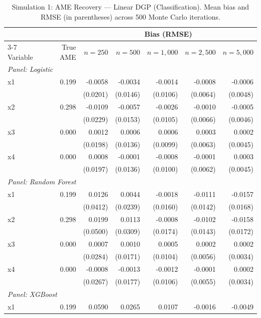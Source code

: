 \begin{table}[htbp]
\centering
\small
\begin{threeparttable}
\caption{Simulation 1: AME Recovery --- Linear DGP (Classification). Mean bias and RMSE (in parentheses) across 500 Monte Carlo iterations.}
\label{tab:sim1_classification_linear}
\begin{tabular}{lrrrrrr}
\toprule
 & & \multicolumn{5}{c}{Bias (RMSE)} \\
\cmidrule(lr){3-7}
Variable & True AME & $n=250$ & $n=500$ & $n=1,000$ & $n=2,500$ & $n=5,000$ \\
\midrule
\multicolumn{7}{l}{\textit{Panel: Logistic}} \\
\quad x1 & 0.199 & -0.0058 & -0.0034 & -0.0014 & -0.0008 & -0.0006 \\
 &  & (0.0201) & (0.0146) & (0.0106) & (0.0064) & (0.0048) \\
\quad x2 & 0.298 & -0.0109 & -0.0057 & -0.0026 & -0.0010 & -0.0005 \\
 &  & (0.0229) & (0.0153) & (0.0105) & (0.0066) & (0.0046) \\
\quad x3 & 0.000 & 0.0012 & 0.0006 & 0.0006 & 0.0003 & 0.0002 \\
 &  & (0.0198) & (0.0136) & (0.0099) & (0.0063) & (0.0045) \\
\quad x4 & 0.000 & 0.0008 & -0.0001 & -0.0008 & -0.0001 & 0.0003 \\
 &  & (0.0197) & (0.0136) & (0.0100) & (0.0062) & (0.0045) \\
\midrule
\multicolumn{7}{l}{\textit{Panel: Random Forest}} \\
\quad x1 & 0.199 & 0.0126 & 0.0044 & -0.0018 & -0.0111 & -0.0157 \\
 &  & (0.0412) & (0.0239) & (0.0160) & (0.0142) & (0.0168) \\
\quad x2 & 0.298 & 0.0199 & 0.0113 & -0.0008 & -0.0102 & -0.0158 \\
 &  & (0.0500) & (0.0309) & (0.0174) & (0.0143) & (0.0172) \\
\quad x3 & 0.000 & 0.0007 & 0.0010 & 0.0005 & 0.0002 & 0.0002 \\
 &  & (0.0284) & (0.0171) & (0.0104) & (0.0056) & (0.0034) \\
\quad x4 & 0.000 & -0.0008 & -0.0013 & -0.0012 & -0.0001 & 0.0002 \\
 &  & (0.0267) & (0.0177) & (0.0106) & (0.0055) & (0.0034) \\
\midrule
\multicolumn{7}{l}{\textit{Panel: XGBoost}} \\
\quad x1 & 0.199 & 0.0590 & 0.0265 & 0.0107 & -0.0016 & -0.0049 \\

\end{tabular}
\end{threeparttable}
\end{table}
